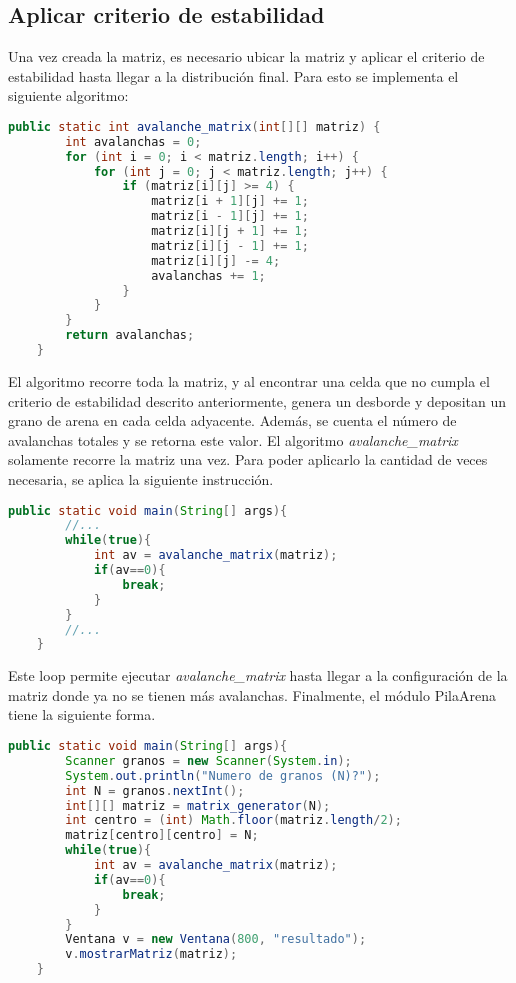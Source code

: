 \documentclass[letterpaper,11pt]{article} %
\begin{document}
\subsection{Aplicar criterio de estabilidad}
Una vez creada la matriz, es necesario ubicar la matriz y aplicar el criterio de estabilidad hasta llegar a la distribución final. Para esto se implementa el siguiente algoritmo:
\lstset{style=Java}
\begin{lstlisting}[language=Java, caption=Algoritmo repasador de matriz]
    public static int avalanche_matrix(int[][] matriz) {
        int avalanchas = 0;
        for (int i = 0; i < matriz.length; i++) {
            for (int j = 0; j < matriz.length; j++) {
                if (matriz[i][j] >= 4) {
                    matriz[i + 1][j] += 1;
                    matriz[i - 1][j] += 1;
                    matriz[i][j + 1] += 1;
                    matriz[i][j - 1] += 1;
                    matriz[i][j] -= 4;
                    avalanchas += 1;
                }
            }
        }
        return avalanchas;
    }
\end{lstlisting}   
\newp
El algoritmo recorre toda la matriz, y al encontrar una celda que no cumpla el criterio de estabilidad descrito anteriormente, genera un desborde y depositan un grano de arena en cada celda adyacente. Además, se cuenta el número de avalanchas totales y se retorna este valor.
\newp
El algoritmo \textit{avalanche\_matrix} solamente recorre la matriz una vez. Para poder aplicarlo la cantidad de veces necesaria, se aplica la siguiente instrucción.
\lstset{style=Java}
\begin{lstlisting}[language=Java, caption=Loop del recorrido de la matriz]
    public static void main(String[] args){
        //...
        while(true){
            int av = avalanche_matrix(matriz);
            if(av==0){
                break;
            }
        }
        //...
    }
\end{lstlisting}
Este loop permite ejecutar \textit{avalanche\_matrix} hasta llegar a la configuración de la matriz donde ya no se tienen más avalanchas.
\newp
Finalmente, el módulo PilaArena tiene la siguiente forma.
\lstset{style=Java}
\begin{lstlisting}[language=Java, caption=Loop del recorrido de la matriz]
    public static void main(String[] args){
        Scanner granos = new Scanner(System.in);
        System.out.println("Numero de granos (N)?");
        int N = granos.nextInt();
        int[][] matriz = matrix_generator(N);
        int centro = (int) Math.floor(matriz.length/2);
        matriz[centro][centro] = N;
        while(true){
            int av = avalanche_matrix(matriz);
            if(av==0){
                break;
            }
        }
        Ventana v = new Ventana(800, "resultado");
        v.mostrarMatriz(matriz);
    }
\end{lstlisting}
\end{document}
